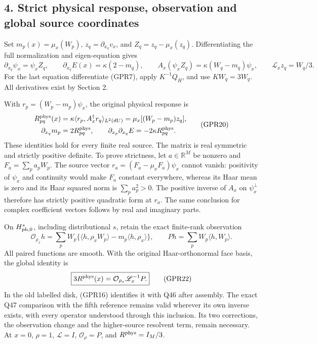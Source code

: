 \documentclass[11pt]{article}
\begin{document}
\subsection*{4. Strict physical response, observation and global source coordinates}

Set \(m_p(x)=\mu_x(W_p)\), \(z_q=\partial_{x_q}v_x\), and \(Z_q=z_q-\mu_x(z_q)\). Differentiating the full normalization and eigen-equation gives
\[
 \partial_{x_q}\psi_x=\psi_xZ_q,\qquad
 \partial_{x_q}E(x)=\kappa(2-m_q),\qquad
 A_x(\psi_xZ_q)=\kappa(W_q-m_q)\psi_x,
 \qquad \mathscr L_xz_q=W_q/3.
 \tag{GPR19}
\]
For the last equation differentiate (GPR7), apply \(K^{-1}Q_H\), and use \(KW_q=3W_q\). All derivatives exist by Section 2.

With \(r_p=(W_p-m_p)\psi_x\), the original physical response is
\[
 \begin{aligned}
 R^{\rm phys}_{pq}(x)
 &=\kappa\langle r_p,A_x^\dagger r_q\rangle_{L^2(dU)}
 =\mu_x[(W_p-m_p)z_q],\\
 \partial_{x_q}m_p&=2R^{\rm phys}_{pq},\qquad
 \partial_{x_p}\partial_{x_q}E=-2\kappa R^{\rm phys}_{pq}.
 \end{aligned}\tag{GPR20}
\]
These identities hold for every finite real source. The matrix is real symmetric and strictly positive definite. To prove strictness, let \(a\in\mathbb R^M\) be nonzero and \(F_a=\sum_pa_pW_p\). The source vector \(r_a=(F_a-\mu_xF_a)\psi_x\) cannot vanish: positivity of \(\psi_x\) and continuity would make \(F_a\) constant everywhere, whereas its Haar mean is zero and its Haar squared norm is \(\sum_pa_p^2>0\). The positive inverse of \(A_x\) on \(\psi_x^\perp\) therefore has strictly positive quadratic form at \(r_a\). The same conclusion for complex coefficient vectors follows by real and imaginary parts.

On \(H^s_{\rm ph,0}\), including distributional \(s\), retain the exact finite-rank observation
\[
 \mathcal O_{\rho_x}h
 =\sum_pW_p\{\langle h,\rho_xW_p\rangle
                       -m_p\langle h,\rho_x\rangle\},\qquad
 Ph=\sum_pW_p\langle h,W_p\rangle.
 \tag{GPR21}
\]
All paired functions are smooth. With the original Haar-orthonormal face basis, the global identity is
\[
 \boxed{3R^{\rm phys}(x)=\mathcal O_{\rho_x}\mathscr L_x^{-1}P.}
 \tag{GPR22}
\]
In the old labelled disk, (GPR16) identifies it with Q46 after assembly. The exact Q47 comparison with the fifth reference remains valid wherever its own inverse exists, with every operator understood through this inclusion. Its two corrections, the observation change and the higher-source resolvent term, remain necessary. At \(x=0\), \(\rho=1\), \(\mathscr L=I\), \(\mathcal O_\rho=P\), and \(R^{\rm phys}=I_M/3\).
\end{document}
